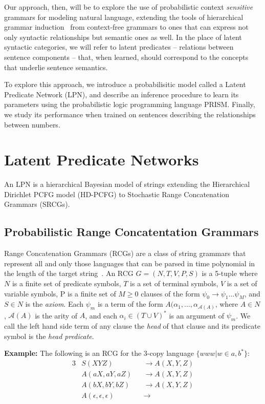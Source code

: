 \documentclass[11pt, twocolumn]{article}
\begin{document}
Our approach, then, will be to explore the use of probabilistic
context \emph{sensitive} grammars for modeling natural language,
extending the tools of hierarchical grammar induction~\cite{SOMEONE} from
context-free grammars to ones that can express not only syntactic
relationships but semantic ones as well. In the place of latent
syntactic categories, we will refer to latent predicates -- relations
between sentence components -- that, when learned, should correspond
to the concepts that underlie sentence semantics.

To explore this approach, we introduce a probabilisitic model called a
Latent Predicate Network (LPN), and describe an inference procedure to
learn its parameters using the probabilistic logic programming
language PRISM. Finally, we study its performance when trained on
sentences describing the relationships between numbers.

\section{Latent Predicate Networks}

An LPN is a hierarchical Bayesian model of strings
extending the Hierarchical Dirichlet PCFG model (HD-PCFG) to
Stochastic Range Concatenation Grammars (SRCGs). 

\subsection{Probabilistic Range Concatentation Grammars}
Range Concatenation Grammars (RCGs) are a class of string grammars
that represent all and only those languages that can be parsed in time
polynomial in the length of the target
string~\cite{boullier2005range}. An RCG $G=(N, T, V, P, S)$ is a
5-tuple where $N$ is a finite set of predicate symbols, $T$ is a set
of terminal symbols, $V$ is a set of variable symbols, P is a finite
set of $M \geq 0$ clauses of the form $\psi_0 \rightarrow \psi_1 \dots
\psi_M$, and $S \in N$ is the \emph{axiom}. Each $\psi_m$ is a term of
the form $A(\alpha_1, \dots, \alpha_{\mathcal{A}(A)}$, where $A \in
N$, $\mathcal{A}(A)$ is the arity of $A$, and each $\alpha_i \in (T
\cup V)^*$ is an argument of $\psi_m$. We call the left hand side term
of any clause the \emph{head} of that clause and its predicate symbol
is the \emph{head predicate}.

\textbf{Example:} The following is an RCG for the 3-copy language
$\{www | w \in {a, b}^*\}$:
\begin{alignat*}{3}
&S(XYZ) &&\rightarrow A(X, Y, Z)\\
&A(aX, aY, aZ) &&\rightarrow A(X, Y, Z)\\
&A(bX, bY, bZ) &&\rightarrow A(X, Y, Z)\\
&A(\epsilon, \epsilon, \epsilon) &&\rightarrow 
\end{alignat*}
\end{document}
